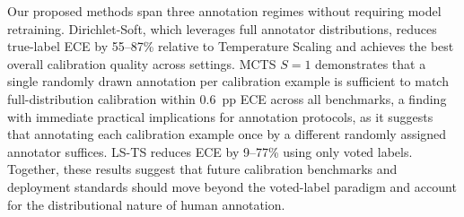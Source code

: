 \documentclass[10pt,journal,compsoc]{IEEEtran}
\begin{document}
Our proposed methods span three annotation regimes without requiring model retraining.  Dirichlet-Soft, which leverages full annotator distributions, reduces true-label ECE by 55--87\% relative to Temperature Scaling and achieves the best overall calibration quality across settings.  MCTS $S{=}1$ demonstrates that a single randomly drawn annotation per calibration example is sufficient to match full-distribution calibration within 0.6~pp ECE across all benchmarks, a finding with immediate practical implications for annotation protocols, as it suggests that annotating each calibration example once by a different randomly assigned annotator suffices.  LS-TS reduces ECE by 9--77\% using only voted labels.  Together, these results suggest that future calibration benchmarks and deployment standards should move beyond the voted-label paradigm and account for the distributional nature of human annotation.




\end{document}
